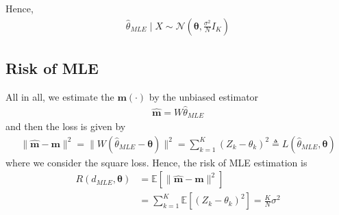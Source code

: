 \documentclass[11pt]{elegantbook}
\begin{document}
Hence,
\begin{equation}
    \begin{aligned}
        \hat{\theta}_{MLE}\mid X\sim \mathcal{N}\left(\boldsymbol{\theta},\frac{\sigma^2}{N}I_K\right)
    \end{aligned}
    \nonumber
\end{equation}

\subsection{Risk of MLE}
All in all, we estimate the $\boldsymbol{m}(\cdot)$ by the unbiased estimator
\begin{equation}
    \begin{aligned}
        \hat{\boldsymbol{m}}=W\hat{\theta}_{MLE}
    \end{aligned}
    \nonumber
\end{equation}
and then the loss is given by
\begin{equation}
    \begin{aligned}
        \|\hat{\boldsymbol{m}}-\boldsymbol{m}\|^2=\|W(\hat{\theta}_{MLE}-\boldsymbol{\theta})\|^2=\sum_{k=1}^K(Z_k-\theta_k)^2\triangleq L(\hat{\theta}_{MLE},\boldsymbol{\theta})
    \end{aligned}
    \nonumber
\end{equation}
where we consider the square loss. Hence, the risk of MLE estimation is
\begin{equation}
    \begin{aligned}
        R(d_{MLE},\boldsymbol{\theta})&=\mathbb{E}[\|\hat{\boldsymbol{m}}-\boldsymbol{m}\|^2]\\
        &=\sum_{k=1}^K\mathbb{E}[(Z_k-\theta_k)^2]=\frac{K}{N}\sigma^2
    \end{aligned}
    \nonumber
\end{equation}
\end{document}
